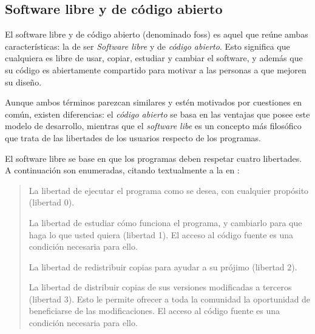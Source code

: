 \subsection{Software libre y de código abierto}
\label{software_libre_codigo_abierto}

El software libre y de código abierto (denominado \gls{foss}) es aquel que reúne ambas características: la de ser \textit{Software libre} y de \textit{código abierto}. Esto significa que cualquiera es libre de usar, copiar, estudiar y cambiar el software, y además que su código es abiertamente compartido para motivar a las personas a que mejoren su diseño\cite{libertades1996fsf}.

Aunque ambos términos parezcan similares y estén motivados por cuestiones en común, existen diferencias: el \textit{código abierto} se basa en las ventajas que posee este modelo de desarrollo, mientras que el \textit{software libe} es un concepto más filosófico que trata de las libertades de los usuarios respecto de los programas.

El software libre se base en que los programas deben respetar cuatro libertades. A continuación son enumeradas, citando textualmente a la  en \cite{libertades1996fsf}:
\blockcquote{libertades1996fsf}{
La libertad de ejecutar el programa como se desea, con cualquier propósito (libertad 0).

La libertad de estudiar cómo funciona el programa, y cambiarlo para que haga lo que usted quiera (libertad 1). El acceso al código fuente es una condición necesaria para ello.

La libertad de redistribuir copias para ayudar a su prójimo (libertad 2).

La libertad de distribuir copias de sus versiones modificadas a terceros (libertad 3). Esto le permite ofrecer a toda la comunidad la oportunidad de beneficiarse de las modificaciones. El acceso al código fuente es una condición necesaria para ello.
}


